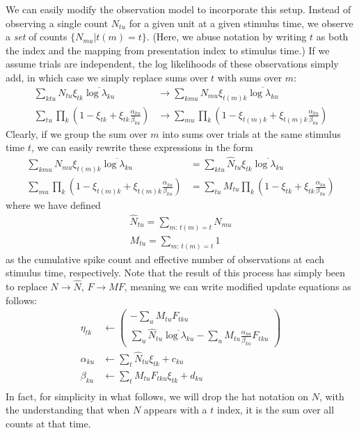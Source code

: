 \documentclass[11pt]{article}
\begin{document}
We can easily modify the observation model to incorporate this setup. Instead of observing a single count $N_{tu}$ for a given unit at a given stimulus time, we observe a \emph{set} of counts $\{ N_{m u} \vert t(m) = t \}$. (Here, we abuse notation by writing $t$ as both the index and the mapping from presentation index to stimulus time.) If we assume trials are independent, the log likelihoods of these observations simply add, in which case we simply replace sums over $t$ with sums over $m$:
\begin{align}
    \sum_{ktu} N_{tu} \xi_{tk} \overline{\log \lambda_{ku}} &\rightarrow \sum_{km u} N_{m u} \xi_{t(m) k} \overline{\log \lambda_{ku}} \\
    \sum_{tu} \prod_k \left( 1 - \xi_{tk} + \xi_{tk} \frac{\alpha_{ku}}{\beta_{ku}}\right) &\rightarrow \sum_{m u} \prod_k \left( 1 - \xi_{t(m) k} + \xi_{t(m) k} \frac{\alpha_{ku}}{\beta_{ku}}\right)
\end{align}
Clearly, if we group the sum over $m$ into sums over trials at the same stimulus time $t$, we can easily rewrite these expressions in the form
\begin{align}
    \sum_{km u} N_{m u} \xi_{t(m) k} \overline{\log \lambda_{ku}} &= \sum_{ktu} \hat{N}_{tu} \xi_{tk} \overline{\log \lambda_{ku}} \\
    \sum_{m u} \prod_k \left( 1 - \xi_{t(m) k} + \xi_{t(m) k} \frac{\alpha_{ku}}{\beta_{ku}}\right) &= \sum_{tu} M_{tu}\prod_k \left( 1 - \xi_{tk} + \xi_{tk} \frac{\alpha_{ku}}{\beta_{ku}}\right)
\end{align}
where we have defined
\begin{align}
    \hat{N}_{tu} = \sum_{m:\, t(m) = t} N_{m u} \\
    M_{tu} = \sum_{m:\, t(m) = t} 1
\end{align}
as the cumulative spike count and effective number of observations at each stimulus time, respectively. Note that the result of this process has simply been to replace $N \rightarrow \hat{N}$, $F \rightarrow M F$, meaning we can write modified update equations as follows:
\begin{align}
    \eta_{tk} &\leftarrow
    \begin{pmatrix}
        -\sum_u M_{tu} F_{tku} \\
        \sum_u \hat{N}_{tu} \overline{\log \lambda_{ku}} -
        \sum_u M_{tu}\frac{\alpha_{ku}}{\beta_{ku}} F_{tku}
    \end{pmatrix} \\
    \alpha_{ku} &\leftarrow \sum_t \hat{N}_{tu} \xi_{tk} + c_{ku} \\
    \beta_{ku} &\leftarrow \sum_t M_{tu} F_{tku}\xi_{tk} + d_{ku} \\
\end{align}
In fact, for simplicity in what follows, we will drop the hat notation on $N$, with the understanding that when $N$ appears with a $t$ index, it is the sum over all counts at that time.
\end{document}
